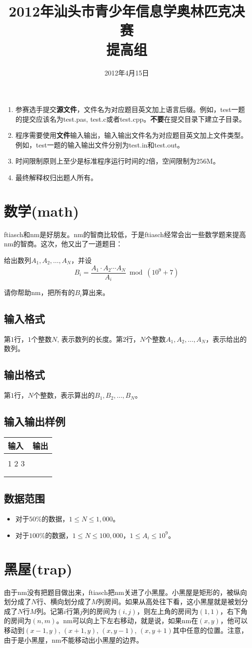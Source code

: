 \documentclass[a4paper]{article}
\title{2012年汕头市青少年信息学奥林匹克决赛\\
提高组}
\date{2012年4月15日}
\newcommand{\problem}{\section}
\newcommand{\inputformat}{\subsection{输入格式}}
\newcommand{\outputformat}{\subsection{输出格式}}
\newcommand{\sample}[2]{
\subsection{输入输出样例}
\begin{tabular}{|l|l|}
    \hline
    输入 & 输出 \\
    \hline
    \begin{minipage}[t]{200pt}
        \begin{ttfamily} #1 \end{ttfamily}
    \end{minipage} &
    \begin{minipage}[t]{200pt}
        \begin{ttfamily} #2 \end{ttfamily}
    \end{minipage} \\
    \hline
\end{tabular}
\vspace{1ex}
\par
}
\newcommand{\dataset}{\subsection{数据范围}}
\begin{document}
\maketitle

\begin{enumerate}
\item 参赛选手提交\textbf{源文件}，文件名为对应题目英文加上语言后缀。例如，test一题的提交应该名为test.pas, test.c或者test.cpp。\textbf{不要}在提交目录下建立子目录。

\item 程序需要使用\textbf{文件}输入输出，输入输出文件名为对应题目英文加上文件类型。例如，test一题的输入输出文件分别为test.in和test.out。

\item 时间限制原则上至少是标准程序运行时间的$2$倍，空间限制为$256$M。

\item 最终解释权归出题人所有。
\end{enumerate}

\problem{数学(math)}

ftiasch和nm是好朋友。nm的智商比较低，于是ftiasch经常会出一些数学题来提高nm的智商。这次，他又出了一道题目：

给出数列$A_1, A_2, \ldots, A_N$，并设\[B_i = \frac{A_1 \cdot A_2 \cdots A_N}{A_i} \bmod (10^9 + 7)\]

请你帮助nm，把所有的$B_i$算出来。

\inputformat{}

第$1$行，$1$个整数$N$, 表示数列的长度。第$2$行，$N$个整数$A_1, A_2, \ldots, A_N$，表示给出的数列。

\outputformat{}

第$1$行，$N$个整数，表示算出的$B_1, B_2, \ldots, B_N$。

\sample{
3 \\
1 2 3 \\
}{
6 3 2 \\
}

\dataset{}

\begin{itemize}
    \item 对于$50\%$的数据，$1 \leq N \leq 1,000$。

    \item 对于$100\%$的数据，$1 \leq N \leq 100,000$，$1 \leq A_i \leq 10^9$。
\end{itemize}

\problem{黑屋(trap)}

由于nm没有把题目做出来，ftiasch把nm关进了小黑屋。小黑屋是矩形的，被纵向划分成了$N$行、横向划分成了$M$列房间。如果从高处往下看，这小黑屋就是被划分成了$N$行$M$列。记第$i$行第$j$列的房间为$(i, j)$，则左上角的房间为$(1, 1)$，右下角的房间为$(n, m)$。nm可以向上下左右移动，就是说，如果nm在$(x, y)$，他可以移动到$(x - 1, y)$, $(x + 1, y)$, $(x, y - 1)$, $(x, y + 1)$其中任意的位置。注意，由于是小黑屋，nm不能移动出小黑屋的边界。
\end{document}
